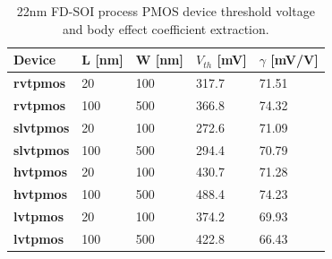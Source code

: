 			\begin{table}[htb!]
				\centering
				\def\arraystretch{1.5}		
				\setlength\arrayrulewidth{1pt}
				\setlength{\tabcolsep}{1em} %
				\fontfamily{\sfdefault}\selectfont 
				\begin{tabular}{|l|l|l|l|l|}	
					\hline 
					\rule[-1ex]{0pt}{2.5ex} \cellcolor{gray!40}\textbf{Device} & \cellcolor{gray!40}\textbf{L [nm]} & \cellcolor{gray!40}\textbf{W [nm]} & \cellcolor{gray!40}\textbf{$V_{th}$ [mV]} & \cellcolor{gray!40}\textbf{$\gamma$ [mV/V]}\\ 
					\hline 
					\rule[-1ex]{0pt}{2.5ex} \textbf{rvtpmos} & 20 & 100 & 317.7 & 71.51 \\ 
					\hline 
					\rule[-1ex]{0pt}{2.5ex} \textbf{rvtpmos} & 100 & 500 & 366.8 & 74.32 \\ 
					\hline 
					\rule[-1ex]{0pt}{2.5ex} \textbf{slvtpmos} & 20 & 100 & 272.6 & 71.09 \\ 
					\hline 
					\rule[-1ex]{0pt}{2.5ex} \textbf{slvtpmos} & 100 & 500 & 294.4 & 70.79 \\ 
					\hline 
					\rule[-1ex]{0pt}{2.5ex} \textbf{hvtpmos} & 20 & 100 & 430.7 & 71.28 \\ 
					\hline 
					\rule[-1ex]{0pt}{2.5ex} \textbf{hvtpmos} & 100 & 500 & 488.4 & 74.23 \\ 
					\hline 
					\rule[-1ex]{0pt}{2.5ex} \textbf{lvtpmos} & 20 & 100 & 374.2 & 69.93 \\ 
					\hline 
					\rule[-1ex]{0pt}{2.5ex} \textbf{lvtpmos} & 100 & 500 & 422.8 & 66.43 \\ 
					\hline 
				\end{tabular} 
				\caption{22nm FD-SOI process PMOS device threshold voltage and body effect coefficient extraction.}
				\label{tab:pfet_vth_gamma}
			\end{table} 	

